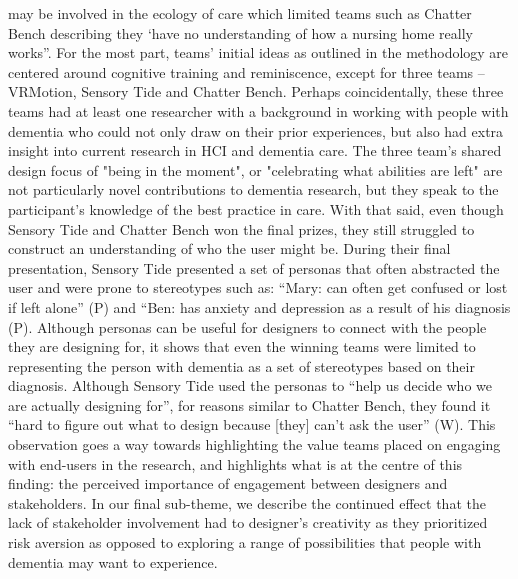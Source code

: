 may be involved in the ecology of care which limited teams such as Chatter Bench describing they ‘have no understanding of how a nursing home really works”. 
For the most part, teams' initial ideas as outlined in the methodology are centered around cognitive training and reminiscence, except for three teams – VRMotion, Sensory Tide and Chatter Bench. Perhaps coincidentally, these three teams had at least one researcher with a background in working with people with dementia who could not only draw on their prior experiences, but also had extra insight into current research in HCI and dementia care. The three team’s shared design focus of "being in the moment", or "celebrating what abilities are left" are not particularly novel contributions to dementia research, but they speak to the participant’s knowledge of the best practice in care. With that said, even though Sensory Tide and Chatter Bench won the final prizes, they still struggled to construct an understanding of who the user might be. During their final presentation, Sensory Tide presented a set of personas that often abstracted the user and were prone to stereotypes such as: “Mary: can often get confused or lost if left alone” (P) and “Ben: has anxiety and depression as a result of his diagnosis (P). Although personas can be useful for designers to connect with the people they are designing for, it shows that even the winning teams were limited to representing the person with dementia as a set of stereotypes based on their diagnosis. Although Sensory Tide used the personas to “help us decide who we are actually designing for”, for reasons similar to Chatter Bench, they found it “hard to figure out what to design because [they] can’t ask the user” (W). This observation goes a way towards highlighting the value teams placed on engaging with end-users in the research, and highlights what is at the centre of this finding: the perceived importance of engagement between designers and stakeholders. In our final sub-theme, we describe the continued effect that the lack of stakeholder involvement had to designer’s creativity as they prioritized risk aversion as opposed to exploring a range of possibilities that people with dementia may want to experience. 

